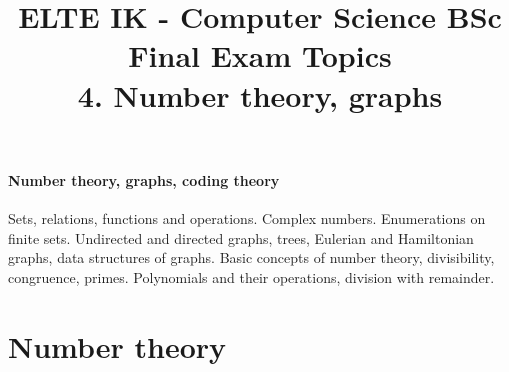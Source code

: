 \documentclass[margin=0px]{article}
\title{\textbf{{\Large ELTE IK - Computer Science BSc} \vspace{0.2cm} \\ {\huge Final Exam Topics}} \vspace{0.3cm} \\ 4. Number theory, graphs}
\author{}
\date{}
\newenvironment{tetel}[1]{\paragraph{#1 \\}}{}
\begin{document}
\maketitle

\begin{center}
\end{center}

\begin{tetel}{Number theory, graphs, coding theory}
    Sets, relations, functions and operations. Complex numbers. Enumerations on finite sets. Undirected and directed graphs, trees, Eulerian and Hamiltonian graphs, data structures of graphs. Basic concepts of number theory, divisibility, congruence, primes. Polynomials and their operations, division with remainder.
\end{tetel}
\section{Number theory}
\end{document}
